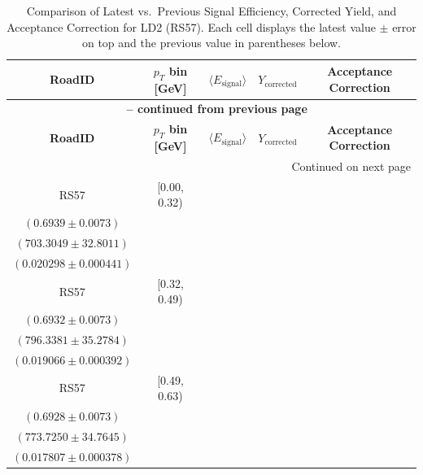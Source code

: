 {\footnotesize
\renewcommand{\arraystretch}{1.35}
\begin{longtable}{|c|c|c|c|c|}
\caption{Comparison of Latest vs.\ Previous Signal Efficiency, Corrected Yield, and Acceptance Correction for LD2 (RS57). Each cell displays the latest value $\pm$ error on top and the previous value in parentheses below.} \label{tab:eff_acc_comp_LD2_RS57} \\
\hline
\textbf{RoadID} & \textbf{$p_{T}$ bin [GeV]} & \textbf{$\langle E_{\mathrm{signal}} \rangle$} & \textbf{$Y_{\mathrm{corrected}}$} & \textbf{Acceptance Correction} \\
\hline
\endfirsthead
\multicolumn{5}{c}{{\bfseries \tablename\ \thetable{} -- continued from previous page}} \\
\hline
\textbf{RoadID} & \textbf{$p_{T}$ bin [GeV]} & \textbf{$\langle E_{\mathrm{signal}} \rangle$} & \textbf{$Y_{\mathrm{corrected}}$} & \textbf{Acceptance Correction} \\
\hline
\endhead
\hline \multicolumn{5}{|r|}{{Continued on next page}} \\ \hline
\endfoot
\hline
\endlastfoot
RS57 & [0.00, 0.32) & \begin{tabular}{@{}c@{}}$0.7272 \pm 0.0055$ \\ $(0.6939 \pm 0.0073)$\end{tabular} & \begin{tabular}{@{}c@{}}$671.0350 \pm 31.2961$ \\ $(703.3049 \pm 32.8011)$\end{tabular} & \begin{tabular}{@{}c@{}}$0.018048 \pm 0.000557$ \\ $(0.020298 \pm 0.000441)$\end{tabular} \\ \hline
RS57 & [0.32, 0.49) & \begin{tabular}{@{}c@{}}$0.7205 \pm 0.0056$ \\ $(0.6932 \pm 0.0073)$\end{tabular} & \begin{tabular}{@{}c@{}}$766.1041 \pm 33.9390$ \\ $(796.3381 \pm 35.2784)$\end{tabular} & \begin{tabular}{@{}c@{}}$0.017107 \pm 0.000492$ \\ $(0.019066 \pm 0.000392)$\end{tabular} \\ \hline
RS57 & [0.49, 0.63) & \begin{tabular}{@{}c@{}}$0.7256 \pm 0.0055$ \\ $(0.6928 \pm 0.0073)$\end{tabular} & \begin{tabular}{@{}c@{}}$738.6735 \pm 33.1896$ \\ $(773.7250 \pm 34.7645)$\end{tabular} & \begin{tabular}{@{}c@{}}$0.016748 \pm 0.000486$ \\ $(0.017807 \pm 0.000378)$\end{tabular} \\ \hline

\end{longtable}}
